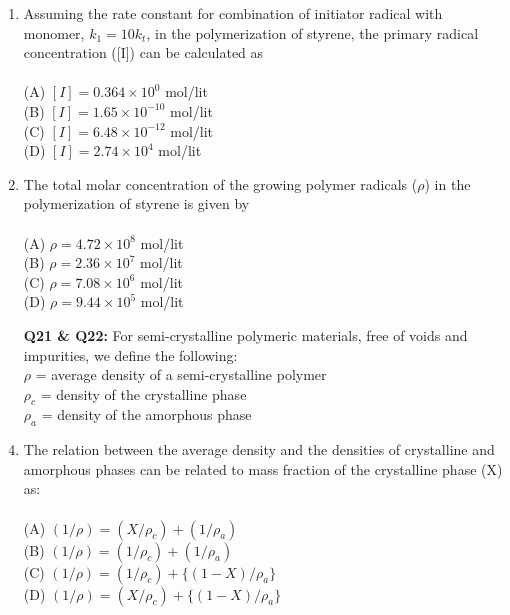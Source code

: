 \documentclass[journal,12pt,onecolumn]{IEEEtran}
\begin{document}
\begin{enumerate}[label=\arabic*)]
\item Assuming the rate constant for combination of initiator radical with monomer, $k_1 = 10 k_t$, in the polymerization of styrene, the primary radical concentration ([I]) can be calculated as\\
\vspace{0.2cm}
\hfill{} \\
(A) $[I] = 0.364 \times 10^0$ mol/lit\\
(B) $[I] = 1.65 \times 10^{-10}$ mol/lit\\
(C) $[I] = 6.48 \times 10^{-12}$ mol/lit\\
(D) $[I] = 2.74 \times 10^4$ mol/lit
\vspace{0.5cm}

\item The total molar concentration of the growing polymer radicals ($\rho$) in the polymerization of styrene is given by\\
\vspace{0.2cm}
\hfill{} \\
(A) $\rho = 4.72 \times 10^8$ mol/lit\\
(B) $\rho = 2.36 \times 10^7$ mol/lit\\
(C) $\rho = 7.08 \times 10^6$ mol/lit\\
(D) $\rho = 9.44 \times 10^5$ mol/lit
\vspace{0.5cm}

\newpage 

\item[\textbf{Q21 \& Q22:}] For semi-crystalline polymeric materials, free of voids and impurities, we define the following:\\
$\rho$ = average density of a semi-crystalline polymer\\
$\rho_c$ = density of the crystalline phase\\
$\rho_a$ = density of the amorphous phase\\

\item The relation between the average density and the densities of crystalline and amorphous phases can be related to mass fraction of the crystalline phase (X) as:\\
\vspace{0.2cm}
\hfill{} \\
(A) $(1/\rho) = (X/\rho_c) + (1/\rho_a)$\\
(B) $(1/\rho) = (1/\rho_c) + (1/\rho_a)$\\
(C) $(1/\rho) = (1/\rho_c) + \{(1 - X)/\rho_a\}$\\
(D) $(1/\rho) = (X/\rho_c) + \{(1 - X)/\rho_a\}$
\vspace{0.5cm}


\end{enumerate}
\end{document}
